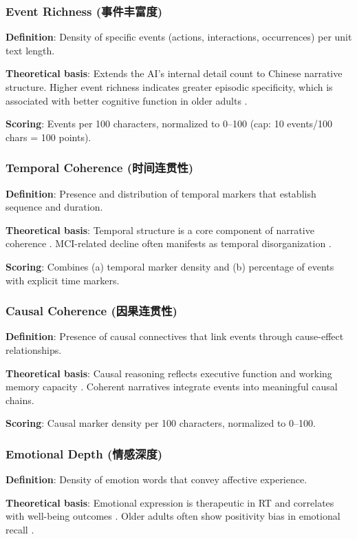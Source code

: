 \documentclass[11pt]{article}
\begin{document}
\subsubsection{Event Richness (事件丰富度)}
\textbf{Definition}: Density of specific events (actions, interactions, occurrences) per unit text length.

\textbf{Theoretical basis}: Extends the AI's internal detail count \citep{levine2002} to Chinese narrative structure. Higher event richness indicates greater episodic specificity, which is associated with better cognitive function in older adults \citep{fraser2015}.

\textbf{Scoring}: Events per 100 characters, normalized to 0--100 (cap: 10 events/100 chars = 100 points).

\subsubsection{Temporal Coherence (时间连贯性)}
\textbf{Definition}: Presence and distribution of temporal markers that establish sequence and duration.

\textbf{Theoretical basis}: Temporal structure is a core component of narrative coherence \citep{habermas2020}. MCI-related decline often manifests as temporal disorganization \citep{devito2025}.

\textbf{Scoring}: Combines (a) temporal marker density and (b) percentage of events with explicit time markers.

\subsubsection{Causal Coherence (因果连贯性)}
\textbf{Definition}: Presence of causal connectives that link events through cause-effect relationships.

\textbf{Theoretical basis}: Causal reasoning reflects executive function and working memory capacity \citep{diamond2013}. Coherent narratives integrate events into meaningful causal chains.

\textbf{Scoring}: Causal marker density per 100 characters, normalized to 0--100.

\subsubsection{Emotional Depth (情感深度)}
\textbf{Definition}: Density of emotion words that convey affective experience.

\textbf{Theoretical basis}: Emotional expression is therapeutic in RT \citep{westerhof2024} and correlates with well-being outcomes \citep{sutin2025}. Older adults often show positivity bias in emotional recall \citep{reed2024}.
\end{document}
